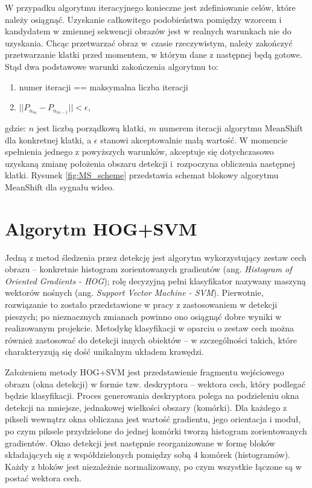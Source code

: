 W przypadku algorytmu iteracyjnego konieczne jest zdefiniowanie celów, które należy osiągnąć. 
Uzyskanie całkowitego podobieństwa pomiędzy wzorcem i kandydatem w zmiennej sekwencji obrazów jest w realnych warunkach nie do uzyskania.
Chcąc przetwarzać obraz w~czasie rzeczywistym, należy zakończyć przetwarzanie klatki przed momentem, w którym dane z następnej będą gotowe. 
Stąd dwa podstawowe warunki zakończenia algorytmu to:
\begin{enumerate}
	\item numer iteracji == maksymalna liczba iteracji
	\item $||P_{n_m}-P_{n_{m-1}}||<\epsilon$, 
\end{enumerate} 
gdzie: $n$ jest liczbą porządkową klatki, $m$ numerem iteracji algorytmu MeanShift dla konkretnej klatki, a $\epsilon$ stanowi akceptowalnie małą wartość.
W momencie spełnienia jednego z powyższych warunków, akceptuje się dotychczasowo uzyskaną zmianę położenia obszaru detekcji i~rozpoczyna obliczenia następnej klatki. 
Rysunek \ref{fig:MS_scheme} przedstawia schemat blokowy algorytmu MeanShift dla sygnału wideo. %




\section{Algorytm HOG+SVM}
\label{sec:HOG&SVM}

Jedną z metod śledzenia przez detekcję jest algorytm wykorzystujący zestaw cech obrazu -- konkretnie histogram zorientowanych gradientów (ang. \textit{Histogram of Oriented Gradients - HOG}); rolę decyzyjną pełni klasyfikator nazywany maszyną wektorów nośnych (ang. \textit{Support Vector Machine - SVM}).
Pierwotnie, rozwiązanie to zostało przedstawione w pracy \cite{Dalal} z zastosowaniem w detekcji pieszych; po nieznacznych zmianach powinno ono osiągnąć dobre wyniki w realizowanym projekcie. 
Metodykę klasyfikacji w oparciu o zestaw cech można również zastosować do detekcji innych obiektów -- w szczególności takich, które charakteryzują się dość unikalnym układem krawędzi.

Założeniem metody HOG+SVM jest przedstawienie fragmentu wejściowego obrazu (okna detekcji) w formie tzw. deskryptora -- wektora cech, który podlegać będzie klasyfikacji.
Proces generowania deskryptora polega na podzieleniu okna detekcji na mniejsze, jednakowej wielkości obszary (komórki). 
Dla każdego z pikseli wewnątrz okna obliczana jest wartość gradientu, jego orientacja i moduł, po czym piksele przydzielone do jednej komórki tworzą histogram zorientowanych gradientów. 
Okno detekcji jest następnie reorganizowane w formę bloków składających się z współdzielonych pomiędzy sobą 4 komórek (histogramów). 
Każdy z bloków jest niezależnie normalizowany, po czym wszystkie łączone są w postać wektora cech.

